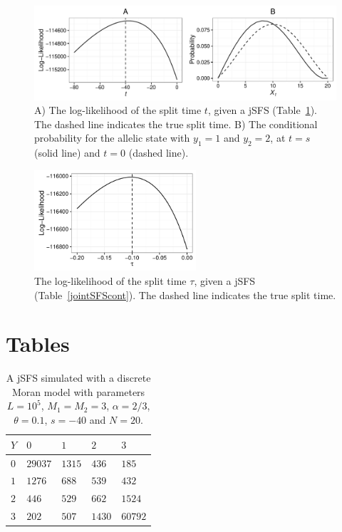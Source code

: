\documentclass[preprint]{elsarticle}
\newcommand\y{\ensuremath{Y}}
\begin{document}
\begin{figure}[ht]
\includegraphics[width = 12cm]{twoPop_29_8_2016.pdf}
\caption{A) The log-likelihood of the split time $t$, given a jSFS (Table~\ref{jointSFSdiscr}). The dashed line indicates the true split time. B) The conditional probability for the allelic state with $y_1=1$ and $y_2=2$, at $t=s$ (solid line) and $t=0$ (dashed line).}\label{twoPopdiscr}
\end{figure}

\begin{figure}[ht]
\includegraphics[width = 6cm]{forw_back_ll_cont.pdf}
\caption{The log-likelihood of the split time $\tau$, given a jSFS (Table~\ref{jointSFScont}). The dashed line indicates the true split time.}\label{twoPopcont}
\end{figure}

\clearpage

\section*{Tables}

\begin{table}[ht]
\centering
\caption{A jSFS simulated with a discrete Moran model with parameters $L=10^5$, $M_1=M_2=3$, $\alpha=2/3$, $\theta=0.1$, $s=-40$ and $N=20$.}
  \begin{tabular}{lllll}
  \toprule
    $\y$&$0$&$1$&$2$&$3$\\
    \midrule
    $0$  &$29037$ &$1315$ &$436$  &$185$\\ 
    $1$  &$1276$  &$688$  &$539$  &$432$\\  
    $2$  &$446$   &$529$  &$662$  &$1524$\\  
    $3$  &$202$   &$507$  &$1430$ &$60792$\\
    \bottomrule
  \end{tabular}\label{jointSFSdiscr}
\end{table}
\end{document}
